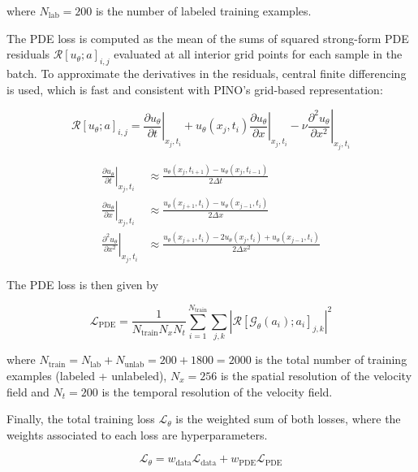 \noindent
where $N_\mathrm{lab} = 200$ is the number of labeled training examples.

The PDE loss is computed as the mean of the sums of squared strong-form PDE residuals $\mathcal{R} \left[ u_\theta ; a \right]_{i,j}$ evaluated at all interior grid points for each sample in the batch. To approximate the derivatives in the residuals, central finite differencing is used, which is fast and consistent with PINO's grid-based representation:

\begin{equation}
	\mathcal{R} \left[ u_\theta ; a \right]_{i,j} =
	 \left. \frac{\partial u_\theta}{\partial t} \right|_{x_j, t_i} 
	 + u_\theta (x_j, t_i) \left. \frac{\partial u_\theta}{\partial x} \right|_{x_j, t_i}
	  - \nu \left. \frac{\partial^2 u_\theta}{\partial x^2} \right|_{x_j, t_i}
\end{equation}

\begin{align}
	\left. \frac{\partial u_\theta}{\partial t} \right|_{x_j, t_i} &\approx \frac{u_\theta(x_j, t_{i+1}) - u_\theta(x_j, t_{i-1})}{2\Delta t}\\
	\left. \frac{\partial u_\theta}{\partial x} \right|_{x_j, t_i} &\approx \frac{u_\theta(x_{j+1}, t_i) - u_\theta(x_{j-1}, t_i)}{2\Delta x}\\
	\left. \frac{\partial^2 u_\theta}{\partial x^2} \right|_{x_j, t_i} &\approx \frac{u_\theta(x_{j+1}, t_i) - 2 u_\theta(x_j, t_i) + u_\theta(x_{j-1}, t_i)}{2\Delta x^2}
\end{align}

The PDE loss is then given by

\begin{equation}
	\mathcal{L}_\mathrm{PDE}
	= \frac{1}{N_\mathrm{train} N_x N_t}
	\sum_{i=1}^{N_\mathrm{train}}\sum_{j,k}
	\left|\mathcal{R} \left[ \mathcal{G}_\theta (a_i); a_i \right]_{j,k}\right|^2
\end{equation}

\noindent
where $N_\mathrm{train} = N_\mathrm{lab} + N_\mathrm{unlab} = 200 + 1800 = 2000$ is the total number of training examples (labeled + unlabeled), $N_x = 256$ is the spatial resolution of the velocity field and $N_t = 200$ is the temporal resolution of the velocity field.

Finally, the total training loss $\mathcal{L}_\theta$ is the weighted sum of both losses, where the weights associated to each loss are hyperparameters.

\begin{equation}
	\mathcal{L}_\theta = w_\mathrm{data} \mathcal{L}_\mathrm{data} + w_\mathrm{PDE} \mathcal{L}_\mathrm{PDE}
\end{equation}


